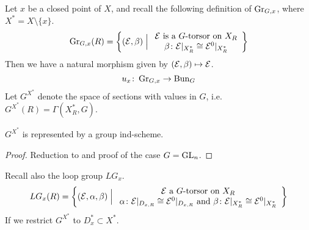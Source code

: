 \documentclass[12pt]{article}
\begin{document}
Let $x$ be a closed point of $X$, and recall the following definition of $\operatorname{Gr}_{G,x}$, where $X^* = X \setminus \{x\}$.
\[\operatorname{Gr}_{G,x}(R) = \left\{(\mathcal{E}, \beta) \;\Big|\; \begin{array}{c} \mathcal{E} \text{ is a } G \text{-torsor on } X_R \\ \beta \colon \mathcal{E}\vert_{X_R^*} \cong \mathcal{E}^0 \vert_{X_R^*} \end{array}\right\}\]
Then we have a natural morphism given by $(\mathcal{E}, \beta) \mapsto \mathcal{E}$. 
\[u_x \colon \operatorname{Gr}_{G,x} \to \operatorname{Bun}_G\]
Let $G^{X^*}$ denote the space of sections with values in $G$, i.e. $G^{X^*}(R) = \Gamma(X^*_R, G)$. 
\begin{lem}
    $G^{X^*}$ is represented by a group ind-scheme.
\end{lem}
\begin{proof}
    Reduction to and proof of the case $G = \operatorname{GL}_n$.
\end{proof}
Recall also the loop group $LG_x$.
\[LG_x(R) = \left\{(\mathcal{E}, \alpha, \beta) \;\Big|\; \begin{array}{c} \mathcal{E} \text{ a } G \text{-torsor on } X_R \\ \alpha \colon \mathcal{E}\vert_{D_{x,R}} \cong \mathcal{E}^0\vert_{D_{x,R}} \text{ and } \beta \colon \mathcal{E}\vert_{X_R^*} \cong \mathcal{E}^0\vert_{X_R^*}\end{array}\right\}\]
If we restrict $G^{X^*}$ to $D_x^* \subset X^*$.

\printbibliography
\end{document}

